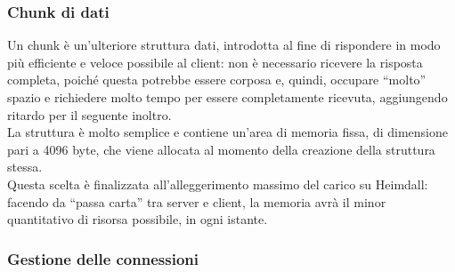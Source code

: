 \documentclass[italian]{tktltiki2}
\begin{document}
\subsubsection*{Chunk di dati}
\label{sec:chunk}
Un chunk è un'ulteriore struttura dati, introdotta al fine di rispondere in modo più efficiente e veloce possibile al client: non è necessario ricevere la risposta completa, poiché questa potrebbe essere corposa e, quindi, occupare ``molto'' spazio e richiedere molto tempo per essere completamente ricevuta, aggiungendo ritardo per il seguente inoltro.
\\
La struttura è molto semplice e contiene un'area di memoria fissa, di dimensione pari a 4096 byte, che viene allocata al momento della creazione della struttura stessa.
\\
Questa scelta è finalizzata all'alleggerimento massimo del carico su Heimdall: facendo da ``passa carta'' tra server e client, la memoria avrà il minor quantitativo di risorsa possibile, in ogni istante. 
\subsubsection{Gestione delle connessioni}
\end{document}

